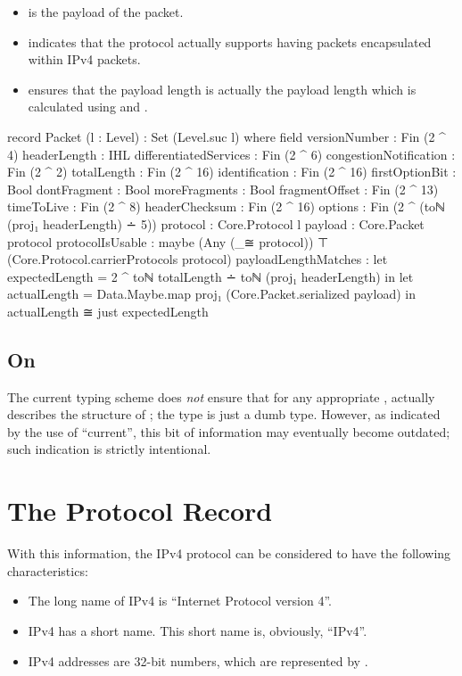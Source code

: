 \documentclass{report}
\begin{document}
\begin{itemize}
\begin{itemize}
	\item {}  is the payload of the  packet.
	\item {}  indicates that the   protocol actually supports having packets encapsulated within IPv4 packets.
	\item {} ensures that the payload length is actually the payload length which is calculated using   and .
\end{itemize}

\begin{code}
    record Packet (l : Level) : Set (Level.suc l) where
      field
        versionNumber : Fin (2 ^ 4)
        headerLength : IHL
        differentiatedServices : Fin (2 ^ 6)
        congestionNotification : Fin (2 ^ 2)
        totalLength : Fin (2 ^ 16)
        identification : Fin (2 ^ 16)
        firstOptionBit : Bool
        dontFragment : Bool
        moreFragments : Bool
        fragmentOffset : Fin (2 ^ 13)
        timeToLive : Fin (2 ^ 8)
        headerChecksum : Fin (2 ^ 16)
        options : Fin (2 ^ (toℕ (proj₁ headerLength) ∸ 5))
        protocol : Core.Protocol l
        payload : Core.Packet protocol
        protocolIsUsable : maybe (Any (_≅ protocol)) ⊤ (Core.Protocol.carrierProtocols protocol)
        payloadLengthMatches :
          let expectedLength = 2 ^ toℕ totalLength ∸ toℕ (proj₁ headerLength) in
          let actualLength = Data.Maybe.map proj₁ (Core.Packet.serialized payload) in
          actualLength ≅ just expectedLength
\end{code}

\subsection{On }
The current typing scheme does \emph{not} ensure that for any appropriate ,   actually describes the structure of  ; the  type is just a dumb  type.  However, as indicated by the use of ``current'', this bit of information may eventually become outdated; such indication is strictly intentional.

\section{The Protocol Record}
With this information, the IPv4 protocol can be considered to have the following characteristics:
\begin{itemize}
	\item The long name of IPv4 is ``Internet Protocol version 4''.
	\item IPv4 has a short name.  This short name is, obviously, ``IPv4''.
	\item IPv4 addresses are 32-bit numbers, which are represented by .
\end{itemize}


\end{itemize}
\end{document}
